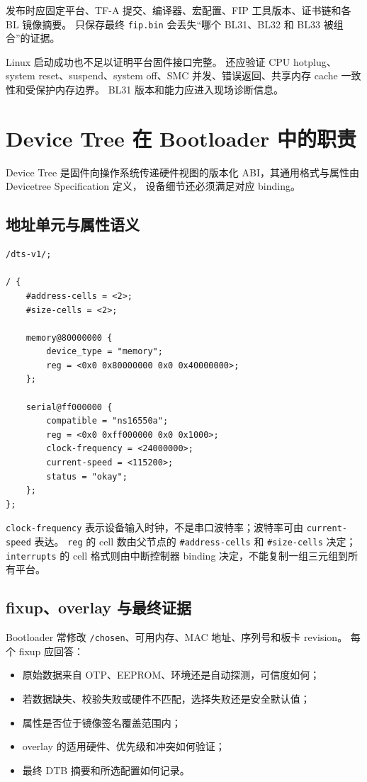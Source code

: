 发布时应固定平台、TF-A 提交、编译器、宏配置、FIP 工具版本、证书链和各 BL 镜像摘要。
只保存最终 \texttt{fip.bin} 会丢失“哪个 BL31、BL32 和 BL33 被组合”的证据。

Linux 启动成功也不足以证明平台固件接口完整。
还应验证 CPU hotplug、system reset、suspend、system off、SMC 并发、错误返回、共享内存 cache 一致性和受保护内存边界。
BL31 版本和能力应进入现场诊断信息。

\section{Device Tree 在 Bootloader 中的职责}

Device Tree 是固件向操作系统传递硬件视图的版本化 ABI，其通用格式与属性由 Devicetree Specification 定义，
设备细节还必须满足对应 binding\cite{devicetree-spec}。

\newpage
\subsection{地址单元与属性语义}

\begin{lstlisting}[language=dts,caption={地址单元和串口属性示意}]
/dts-v1/;

/ {
    #address-cells = <2>;
    #size-cells = <2>;

    memory@80000000 {
        device_type = "memory";
        reg = <0x0 0x80000000 0x0 0x40000000>;
    };

    serial@ff000000 {
        compatible = "ns16550a";
        reg = <0x0 0xff000000 0x0 0x1000>;
        clock-frequency = <24000000>;
        current-speed = <115200>;
        status = "okay";
    };
};
\end{lstlisting}

\texttt{clock-frequency} 表示设备输入时钟，不是串口波特率；波特率可由 \texttt{current-speed} 表达。
\texttt{reg} 的 cell 数由父节点的 \texttt{\#address-cells} 和 \texttt{\#size-cells} 决定；
\texttt{interrupts} 的 cell 格式则由中断控制器 binding 决定，不能复制一组三元组到所有平台。

\subsection{fixup、overlay 与最终证据}

Bootloader 常修改 \texttt{/chosen}、可用内存、MAC 地址、序列号和板卡 revision。
每个 fixup 应回答：

\begin{itemize}
  \item 原始数据来自 OTP、EEPROM、环境还是自动探测，可信度如何；
  \item 若数据缺失、校验失败或硬件不匹配，选择失败还是安全默认值；
  \item 属性是否位于镜像签名覆盖范围内；
  \item overlay 的适用硬件、优先级和冲突如何验证；
  \item 最终 DTB 摘要和所选配置如何记录。
\end{itemize}


